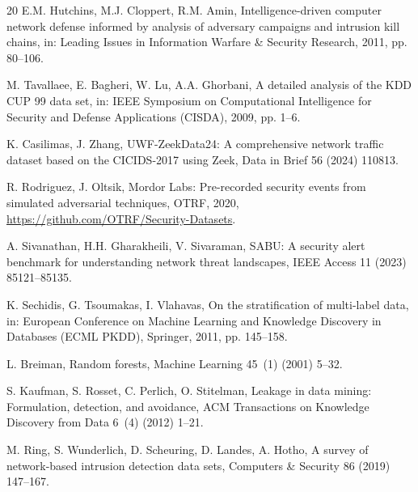 \documentclass[review]{elsarticle}
\begin{document}
\begin{thebibliography}{20}
E.M. Hutchins, M.J. Cloppert, R.M. Amin, Intelligence-driven computer network defense informed by analysis of adversary campaigns and intrusion kill chains, in: Leading Issues in Information Warfare \& Security Research, 2011, pp. 80--106.

M. Tavallaee, E. Bagheri, W. Lu, A.A. Ghorbani, A detailed analysis of the KDD CUP 99 data set, in: IEEE Symposium on Computational Intelligence for Security and Defense Applications (CISDA), 2009, pp. 1--6.

K. Casilimas, J. Zhang, UWF-ZeekData24: A comprehensive network traffic dataset based on the CICIDS-2017 using Zeek, Data in Brief 56 (2024) 110813.

R. Rodriguez, J. Oltsik, Mordor Labs: Pre-recorded security events from simulated adversarial techniques, OTRF, 2020, \url{https://github.com/OTRF/Security-Datasets}.

A. Sivanathan, H.H. Gharakheili, V. Sivaraman, SABU: A security alert benchmark for understanding network threat landscapes, IEEE Access 11 (2023) 85121--85135.

K. Sechidis, G. Tsoumakas, I. Vlahavas, On the stratification of multi-label data, in: European Conference on Machine Learning and Knowledge Discovery in Databases (ECML PKDD), Springer, 2011, pp. 145--158.

L. Breiman, Random forests, Machine Learning 45~(1) (2001) 5--32.

S. Kaufman, S. Rosset, C. Perlich, O. Stitelman, Leakage in data mining: Formulation, detection, and avoidance, ACM Transactions on Knowledge Discovery from Data 6~(4) (2012) 1--21.

M. Ring, S. Wunderlich, D. Scheuring, D. Landes, A. Hotho, A survey of network-based intrusion detection data sets, Computers \& Security 86 (2019) 147--167.

\end{thebibliography}
\end{document}
